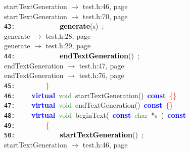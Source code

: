\documentclass{article}
\begin{document}
\mbox{}{\hfill startTextGeneration $\rightarrow$ test.h:46, page~\pageref{test.h:46}} \\
\mbox{}{\hfill startTextGeneration $\rightarrow$ test.h:70, page~\pageref{test.h:70}} \\
\mbox{}\texttt{\textcolor{Black}{43:}} \ \ \ \ \ \ \ \ \ \ \ \ \textbf{\textcolor{Black}{generate}}\textcolor{BrickRed}{(}s\textcolor{BrickRed}{)}\ \textcolor{BrickRed}{;} \\
\mbox{}{\hfill generate $\rightarrow$ test.h:28, page~\pageref{test.h:28}} \\
\mbox{}{\hfill generate $\rightarrow$ test.h:29, page~\pageref{test.h:29}} \\
\mbox{}\texttt{\textcolor{Black}{44:}} \ \ \ \ \ \ \ \ \ \ \ \ \textbf{\textcolor{Black}{endTextGeneration}}\textcolor{BrickRed}{()}\ \textcolor{BrickRed}{;} \\
\mbox{}{\hfill endTextGeneration $\rightarrow$ test.h:47, page~\pageref{test.h:47}} \\
\mbox{}{\hfill endTextGeneration $\rightarrow$ test.h:76, page~\pageref{test.h:76}} \\
\mbox{}\texttt{\textcolor{Black}{45:}} \ \ \ \ \ \ \ \ \textcolor{Red}{\}} \\
\mbox{}\texttt{\textcolor{Black}{46:}} \ \ \ \ \textbf{\textcolor{Blue}{virtual}}\ \textcolor{ForestGreen}{void}\ \label{test.h:46}startTextGeneration\textcolor{BrickRed}{()}\ \textbf{\textcolor{Blue}{const}}\ \textcolor{Red}{\{\}} \\
\mbox{}\texttt{\textcolor{Black}{47:}} \ \ \ \ \textbf{\textcolor{Blue}{virtual}}\ \textcolor{ForestGreen}{void}\ \label{test.h:47}endTextGeneration\textcolor{BrickRed}{()}\ \textbf{\textcolor{Blue}{const}}\ \textcolor{Red}{\{\}} \\
\mbox{}\texttt{\textcolor{Black}{48:}} \ \ \ \ \textbf{\textcolor{Blue}{virtual}}\ \textcolor{ForestGreen}{void}\ \label{test.h:48}beginText\textcolor{BrickRed}{(}\ \textbf{\textcolor{Blue}{const}}\ \textcolor{ForestGreen}{char}\ \textcolor{BrickRed}{*}s\ \textcolor{BrickRed}{)}\ \textbf{\textcolor{Blue}{const}} \\
\mbox{}\texttt{\textcolor{Black}{49:}} \ \ \ \ \ \ \ \ \textcolor{Red}{\{} \\
\mbox{}\texttt{\textcolor{Black}{50:}} \ \ \ \ \ \ \ \ \ \ \ \ \textbf{\textcolor{Black}{startTextGeneration}}\textcolor{BrickRed}{()}\ \textcolor{BrickRed}{;} \\
\mbox{}{\hfill startTextGeneration $\rightarrow$ test.h:46, page~\pageref{test.h:46}} \\
\end{document}
